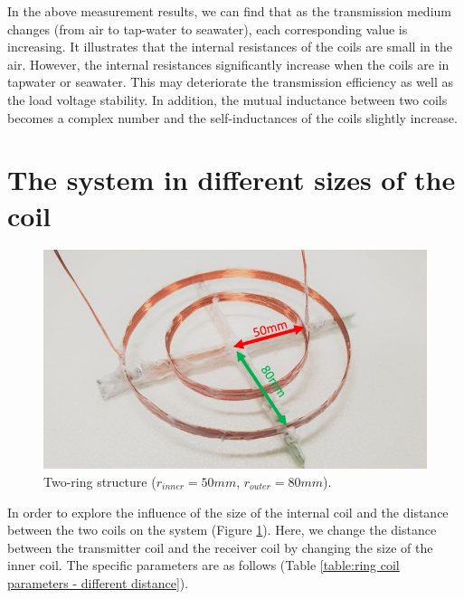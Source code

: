 In the above measurement results, we can find that as the transmission medium changes (from air to tap-water to seawater), each corresponding value is increasing.
It illustrates that the internal resistances of the coils are small in the air.
However, the internal resistances significantly increase when the coils are in tapwater or seawater.
This may deteriorate the transmission efficiency as well as the load voltage stability.
In addition, the mutual inductance between two coils becomes a complex number and the self-inductances of the coils slightly increase. 

\section{The system in different sizes of the coil}

\begin{figure}[!t]
    \centering
    \includegraphics[width=0.9\linewidth]{images/3_two_ring_coil_5cm_8cm.png}
    \caption{Two-ring structure ($r_{inner}=50mm$, $r_{outer}=80mm$).}
    \label{fig:3_two_ring_coil_5cm_8cm}
\end{figure}

In order to explore the influence of the size of the internal coil and the distance between the two coils on the system (Figure \ref{fig:3_two_ring_coil_5cm_8cm}). Here, we change the distance between the transmitter coil and the receiver coil by changing the size of the inner coil. The specific parameters are as follows (Table \ref{table:ring coil parameters - different distance}).

